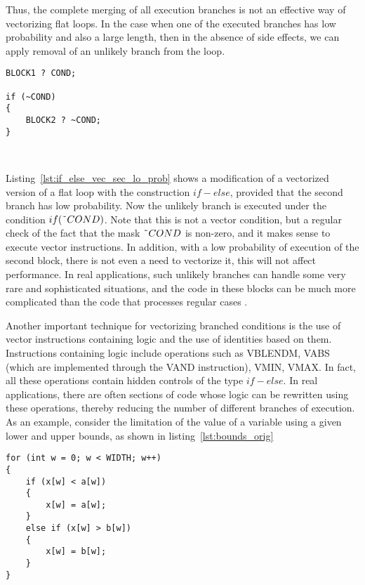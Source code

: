 \documentclass[
11pt,%
tightenlines,%
twoside,%
onecolumn,%
nofloats,%
nobibnotes,%
nofootinbib,%
superscriptaddress,%
noshowpacs,%
centertags]%
{revtex4}
\begin{document}
Thus, the complete merging of all execution branches is not an effective way of vectorizing flat loops.
In the case when one of the executed branches has low probability and also a large length, then in the absence of side effects, we can apply removal of an unlikely branch from the loop.

\begin{lstlisting}[caption={Vectorization of $if-else$ with unlikely branch.},label={lst:if_else_vec_sec_lo_prob}]
BLOCK1 ? COND;

if (~COND)
{
    BLOCK2 ? ~COND;
}
\end{lstlisting}

\

Listing~\ref{lst:if_else_vec_sec_lo_prob} shows a modification of a vectorized version of a flat loop with the construction $if-else$, provided that the second branch has low probability.
Now the unlikely branch is executed under the condition $if (\text{\~{}}COND)$.
Note that this is not a vector condition, but a regular check of the fact that the mask $\text{\~{}}COND$ is non-zero, and it makes sense to execute vector instructions.
In addition, with a low probability of execution of the second block, there is not even a need to vectorize it, this will not affect performance.
In real applications, such unlikely branches can handle some very rare and sophisticated situations, and the code in these blocks can be much more complicated than the code that processes regular cases \cite{Rybakov_Aircraft}.

Another important technique for vectorizing branched conditions is the use of vector instructions containing logic and the use of identities based on them.
Instructions containing logic include operations such as VBLENDM, VABS (which are implemented through the VAND instruction), VMIN, VMAX.
In fact, all these operations contain hidden controls of the type $if-else$.
In real applications, there are often sections of code whose logic can be rewritten using these operations, thereby reducing the number of different branches of execution.
As an example, consider the limitation of the value of a variable using a given lower and upper bounds, as shown in listing~\ref{lst:bounds_orig}

\begin{lstlisting}[caption={Limiting the value using the lower and upper bounds.},label={lst:bounds_orig}]
for (int w = 0; w < WIDTH; w++)
{
    if (x[w] < a[w])
    {
        x[w] = a[w];
    }
    else if (x[w] > b[w])
    {
        x[w] = b[w];
    }
}
\end{lstlisting}
\end{document}
